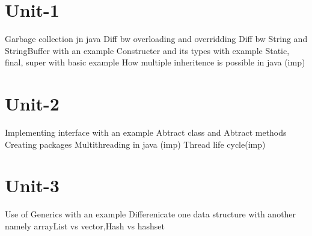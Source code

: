 \documentclass{exam}
\begin{document}
\begin{center}
\end{center}
\section*{Unit-1}
\begin{questions}
\question Garbage collection jn java
\question Diff bw overloading and overridding
\question Diff bw String and StringBuffer with an example
\question Constructer and its types with example
\question Static, final, super with basic example
\question How multiple inheritence is possible in java (imp)

\end{questions}
\section*{Unit-2}
\begin{questions}
\question Implementing interface with an example
\question Abtract class and Abtract methods
\question Creating packages
\question Multithreading in java (imp)
\question Thread life cycle(imp)
\end{questions}

\section*{Unit-3}
\begin{questions}
\question Use of Generics with an example
\question Differenicate one data structure with another namely arrayList vs vector,Hash vs hashset
\end{questions}
\end{document}
